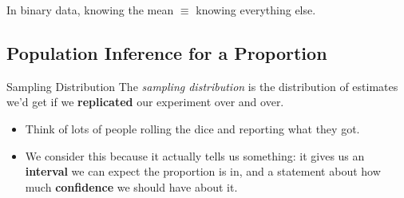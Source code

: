 \begin{rmk}
	In binary data, knowing the mean $\equiv$ knowing everything else. 
\end{rmk}

\subsection{Population Inference for a Proportion}
\begin{df}{Sampling Distribution}
	The \textit{sampling distribution} is the distribution of estimates we'd get if we \textbf{replicated} our experiment over and over. 
\end{df}
\begin{itemize}
	\item Think of lots of people rolling the dice and reporting what they got. 
	\item We consider this because it actually tells us something: it gives us an \textbf{interval} we can expect the proportion is in, and a statement about how much \textbf{confidence} we should have about it. 
\end{itemize}
